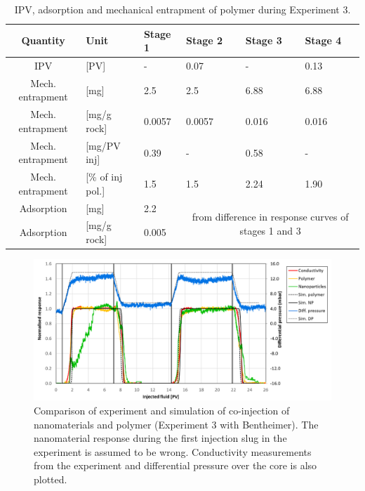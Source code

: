 \documentclass[nanomaterials,article,submit,moreauthors,pdftex]{Definitions/mdpi}
\begin{document}
\begin{table}[h!]
\small
\centering
\caption{IPV, adsorption and mechanical entrapment of polymer during Experiment 3.}
\label{tab:ipvexp3pol}
\begin{tabular}{c l l l l l } 
\toprule
\textbf{Quantity} & \textbf{Unit} & \textbf{Stage 1} & \textbf{Stage 2} & \textbf{Stage 3} & \textbf{Stage 4} \\ 
\midrule 
IPV                & [PV]           & -         & 0.07     & -         & 0.13     \\
Mech. entrapment   & [mg]          & 2.5       & 2.5      & 6.88       & 6.88       \\ 
Mech. entrapment   & [mg/g rock]   & 0.0057   & 0.0057     & 0.016     & 0.016     \\ 
Mech. entrapment   & [mg/PV inj]   & 0.39      & -         & 0.58      & -         \\
Mech. entrapment   & [\% of inj pol.]& 1.5       & 1.5       & 2.24       & 1.90       \\ 
Adsorption         & [mg]          & 2.2      &   \multicolumn{3}{c}{\multirow{2}{15em}{from difference in response curves of stages 1 and 3}}        \\
Adsorption         & [mg/g rock]   & 0.005      &  \multicolumn{3}{c}{}    \\ 
\bottomrule
\end{tabular}
\end{table}

\begin{figure}[h!]
    \centering
    \includegraphics[width=.8\textwidth]{fig/simExpNP3.png}
    \caption{Comparison of experiment and simulation of co-injection of nanomaterials and polymer (Experiment 3 with Bentheimer). The nanomaterial response during the first injection slug in the experiment is assumed to be wrong. Conductivity measurements from the experiment and differential pressure over the core is also plotted.}
    \label{cht:simExpNP3}
\end{figure}
\end{document}
